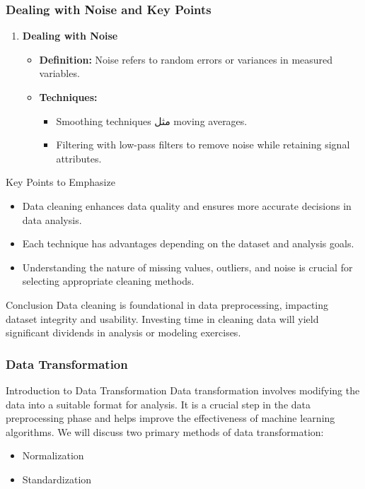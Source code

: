 \documentclass[aspectratio=169]{beamer}
\begin{document}
\begin{frame}[fragile]
    \frametitle{Dealing with Noise and Key Points}
    \begin{enumerate}
        \item \textbf{Dealing with Noise}
        \begin{itemize}
            \item \textbf{Definition:} Noise refers to random errors or variances in measured variables.
            \item \textbf{Techniques:}
            \begin{itemize}
                \item Smoothing techniques مثل moving averages.
                \item Filtering with low-pass filters to remove noise while retaining signal attributes.
            \end{itemize}
        \end{itemize}
    \end{enumerate}

    \begin{block}{Key Points to Emphasize}
        \begin{itemize}
            \item Data cleaning enhances data quality and ensures more accurate decisions in data analysis.
            \item Each technique has advantages depending on the dataset and analysis goals.
            \item Understanding the nature of missing values, outliers, and noise is crucial for selecting appropriate cleaning methods.
        \end{itemize}
    \end{block}
    
    \begin{block}{Conclusion}
        Data cleaning is foundational in data preprocessing, impacting dataset integrity and usability. 
        Investing time in cleaning data will yield significant dividends in analysis or modeling exercises.
    \end{block}
\end{frame}

\begin{frame}[fragile]
    \frametitle{Data Transformation}
    \begin{block}{Introduction to Data Transformation}
        Data transformation involves modifying the data into a suitable format for analysis. It is a crucial step in the data preprocessing phase and helps improve the effectiveness of machine learning algorithms. 
        We will discuss two primary methods of data transformation: 
        \begin{itemize}
            \item Normalization
            \item Standardization
        \end{itemize}
    \end{block}
\end{frame}
\end{document}

